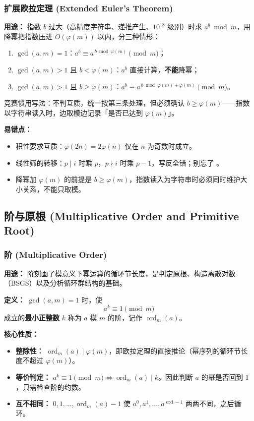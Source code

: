 \subsubsection{扩展欧拉定理 (Extended Euler's Theorem)}

\textbf{用途：}
指数 $b$ 过大（高精度字符串、递推产生、$10^{18}$ 级别）时求 $a^{b} \bmod m$，用降幂把指数压进 $O(\varphi(m))$ 以内，分三种情形：
\begin{enumerate}
    \item $\gcd(a, m) = 1$：$a^{b} \equiv a^{\,b \bmod \varphi(m)} \pmod{m}$；
    \item $\gcd(a, m) > 1$ 且 $b < \varphi(m)$：$a^{b}$ 直接计算，\textbf{不能}降幂；
    \item $\gcd(a, m) > 1$ 且 $b \ge \varphi(m)$：$a^{b} \equiv a^{\,b \bmod \varphi(m) + \varphi(m)} \pmod{m}$。
\end{enumerate}

竞赛惯用写法：不判互质，统一按第三条处理，但必须确认 $b \ge \varphi(m)$——指数以字符串读入时，边取模边记录「是否已达到 $\varphi(m)$」。

\textbf{易错点：}
\begin{itemize}
    \item 积性要求互质：$\varphi(2n) = 2\varphi(n)$ 仅在 $n$ 为奇数时成立。
    \item 线性筛的转移：$p \mid i$ 时乘 $p$，$p \nmid i$ 时乘 $p-1$，写反全错；别忘了 。
    \item 降幂加 $\varphi(m)$ 的前提是 $b \ge \varphi(m)$，指数读入为字符串时必须同时维护大小关系，不能只取模。
\end{itemize}

\subsection{阶与原根 (Multiplicative Order and Primitive Root)}

\subsubsection{阶 (Multiplicative Order)}

\textbf{用途：}
阶刻画了模意义下幂运算的循环节长度，是判定原根、构造离散对数（BSGS）以及分析循环群结构的基础。

\textbf{定义：} $\gcd(a, m) = 1$ 时，使
\[
a^{k} \equiv 1 \pmod{m}
\]
成立的\textbf{最小正整数} $k$ 称为 $a$ 模 $m$ 的阶，记作 $\operatorname{ord}_m(a)$。

\textbf{核心性质：}
\begin{itemize}
    \item \textbf{整除性：} $\operatorname{ord}_m(a) \mid \varphi(m)$，即欧拉定理的直接推论（幂序列的循环节长度不超过 $\varphi(m)$）。
    \item \textbf{等价判定：} $a^{k} \equiv 1 \pmod{m} \iff \operatorname{ord}_m(a) \mid k$。因此判断 $a$ 的幂是否回到 $1$，只需检查阶的约数。
    \item \textbf{互不相同：} $0, 1, \dots, \operatorname{ord}_m(a)-1$ 使 $a^0, a^1, \dots, a^{\operatorname{ord}-1}$ 两两不同，之后循环。
\end{itemize}

